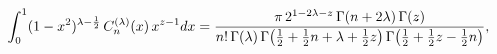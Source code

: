 \[\int_{0}^{1}(1-x^{2})^{\lambda-\frac{1}{2}}\mathop{C^{(\lambda)}_{n}\/}%
\nolimits\!\left(x\right)x^{z-1}dx=\frac{\pi\,2^{1-2\lambda-z}\mathop{\Gamma\/%
}\nolimits\!\left(n+2\lambda\right)\mathop{\Gamma\/}\nolimits\!\left(z\right)}%
{n!\mathop{\Gamma\/}\nolimits\!\left(\lambda\right)\mathop{\Gamma\/}\nolimits%
\!\left(\frac{1}{2}+\frac{1}{2}n+\lambda+\frac{1}{2}z\right)\mathop{\Gamma\/}%
\nolimits\!\left(\frac{1}{2}+\frac{1}{2}z-\frac{1}{2}n\right)},\]